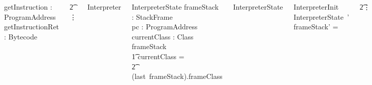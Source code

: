 \documentclass{beamer}
\begin{document}
\begin{frame}
  \begin{columns}[c]
    \tiny
    \setlength{\zedindent}{0cm}
    \setlength{\zedleftsep}{0.1cm}
    \setlength{\zedtab}{0.5cm}
  \begin{circus}
    \circchannel getInstruction : ProgramAddress \\
    \circchannel getInstructionRet : Bytecode \\
  \end{circus}
  \vspace{-1.3cm}
  \begin{circus}
    \t2 \vdots
  \end{circus}
  \vspace{-1cm}
  \begin{circus}
    \circprocess Interpreter \circdef \circbegin
  \end{circus}
  \vspace{-1cm}
  \begin{schema}{InterpreterState}
    frameStack : \seq StackFrame \\
    pc : ProgramAddress \\
    currentClass : Class
  \where
  frameStack \neq \emptyset \implies \\
  \t1 currentClass = \\
  \t2 (last~frameStack).frameClass
  \end{schema}
  \vspace{-1cm}
  \begin{circusaction}
    \circstate InterpreterState
  \end{circusaction}
  \vfill
  \vspace{-0.5cm}
  \begin{schema}{InterpreterInit}
    InterpreterState~'
  \where
    frameStack' = \emptyset
  \end{schema}
  \vspace{-1cm}
  \begin{circusaction}
    \t2\vdots
  \end{circusaction}
  \vspace{-1cm}
  \begin{circusaction}
    Loop \circdef \\
    \t1 (frameStack \neq \emptyset) \circguard HandleInstruction \\
    \t1 {} \extchoice (frameStack = \emptyset) \circguard StartInterpreter \circseq \\
    \t1 Loop
  \end{circusaction}
  \vspace{-0.8cm}
  \begin{circusaction}
    \circspot \lschexpract InterpreterInit \rschexpract \circseq Loop
  \end{circusaction}
  \vspace{-1cm}
  \begin{circus}
    \circend
  \end{circus}
  \vfill
\end{columns}
\end{frame}
  
\end{document}
